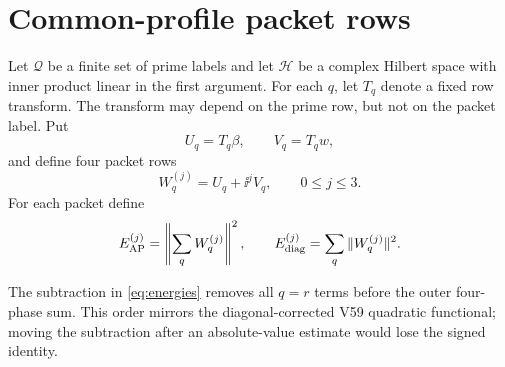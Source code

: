 \section{Common-profile packet rows}

Let $\mathcal Q$ be a finite set of prime labels and let $\mathcal H$ be a complex
Hilbert space with inner product linear in the first argument.  For each $q$, let
$T_q$ denote a fixed row transform.  The transform may depend on the prime row, but not
on the packet label.  Put
\[
 U_q=T_q\beta,\qquad V_q=T_q w,
\]
and define four packet rows
\begin{equation}
 W_q^{(j)}=U_q+\ii^jV_q,\qquad 0\le j\le3.
 \label{eq:packet-row}
\end{equation}
For each packet define
\begin{equation}
 E_{\rm AP}^{(j)}=\left\|\sum_qW_q^{(j)}\right\|^2,
 \qquad
 E_{\rm diag}^{(j)}=\sum_q\|W_q^{(j)}\|^2.
 \label{eq:energies}
\end{equation}

The subtraction in \eqref{eq:energies} removes all $q=r$ terms before the outer
four-phase sum.  This order mirrors the diagonal-corrected V59 quadratic functional;
moving the subtraction after an absolute-value estimate would lose the signed identity.

